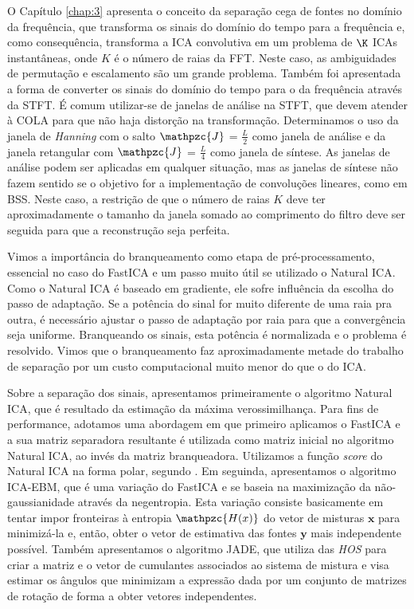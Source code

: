 O Capítulo \ref{chap:3} apresenta o conceito da separação cega de fontes no domínio da frequência, que transforma os sinais do domínio do tempo para a frequência e, como consequência, transforma a ICA convolutiva em um problema de $\K$ ICAs instantâneas, onde ${K}$ é o número de raias da FFT. Neste caso, as ambiguidades de permutação e escalamento são um grande problema. Também foi apresentada a forma de converter os sinais do domínio do tempo para o da frequência através da STFT. É comum utilizar-se de janelas de análise na STFT, que devem atender à COLA para que não haja distorção na transformação. Determinamos o uso da janela de \textit{Hanning} com o salto $\mathpzc{J}$ = $\frac{L}{2}$ como janela de análise e da janela retangular com  $\mathpzc{J}$ = $\frac{L}{4}$ como janela de síntese. As janelas de análise podem ser aplicadas em qualquer situação, mas as janelas de síntese não fazem sentido se o objetivo for a implementação de convoluções lineares, como em BSS. Neste caso, a restrição de que o número de raias ${K}$ deve ter aproximadamente o tamanho da janela somado ao comprimento do filtro deve ser seguida para que a reconstrução seja perfeita. 

Vimos a importância do branqueamento como etapa de pré-processamento, essencial no caso do FastICA e um passo muito útil se utilizado o Natural ICA. Como o Natural ICA é baseado em gradiente, ele sofre influência da escolha do passo de adaptação. Se a potência do sinal for muito diferente de uma raia pra outra, é necessário ajustar o passo de adaptação por raia para que a convergência seja uniforme. Branqueando os sinais, esta potência é normalizada e o problema é resolvido. Vimos que o branqueamento faz aproximadamente metade do trabalho de separação por um custo computacional muito menor do que o do ICA.
 
Sobre a separação dos sinais, apresentamos primeiramente o algoritmo Natural ICA, que é resultado da estimação da máxima verossimilhança. Para fins de performance, adotamos uma abordagem em que primeiro aplicamos o FastICA e a sua matriz separadora resultante é utilizada como matriz inicial no algoritmo Natural ICA, ao invés da matriz branqueadora. Utilizamos a função \textit{score} do Natural ICA na forma polar, segundo \cite{LuizVictorio}. Em seguinda, apresentamos o algoritmo ICA-EBM, que é uma variação do FastICA e se baseia na maximização da não-gaussianidade através da negentropia. Esta variação consiste basicamente em tentar impor fronteiras à entropia $\mathpzc{H(x)}$ do vetor de misturas $\mathbf{x}$ para minimizá-la e, então, obter o vetor de estimativa das fontes $\mathbf{y}$ mais independente possível. Também apresentamos o algoritmo JADE, que utiliza das \textit{HOS} para criar a matriz e o vetor de cumulantes associados ao sistema de mistura e visa estimar os ângulos que minimizam a expressão dada por um conjunto de matrizes de rotação de forma a obter vetores independentes.

